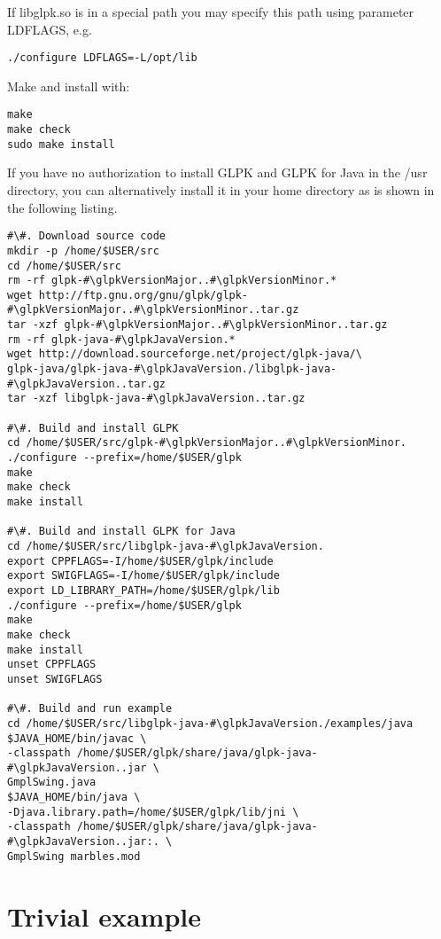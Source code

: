 \documentclass[a4paper,11pt]{report}
\newcommand{\glpkJavaVersion}{1.10.0}
\newcommand{\glpkVersionMajor}{4}
\newcommand{\glpkVersionMinor}{63}
\begin{document}
If libglpk.so is in a special path you may specify this path using parameter
LDFLAGS, e.g.

\begin{lstlisting}
./configure LDFLAGS=-L/opt/lib
\end{lstlisting}

Make and install with:

\begin{lstlisting}
make
make check
sudo make install
\end{lstlisting}

If you have no authorization to install GLPK and GLPK
for Java in the /usr directory, you can alternatively install it in your home
directory as is shown in the following listing.

\begin{lstlisting}
#\#. Download source code
mkdir -p /home/$USER/src
cd /home/$USER/src
rm -rf glpk-#\glpkVersionMajor..#\glpkVersionMinor.*
wget http://ftp.gnu.org/gnu/glpk/glpk-#\glpkVersionMajor..#\glpkVersionMinor..tar.gz
tar -xzf glpk-#\glpkVersionMajor..#\glpkVersionMinor..tar.gz
rm -rf glpk-java-#\glpkJavaVersion.*
wget http://download.sourceforge.net/project/glpk-java/\
glpk-java/glpk-java-#\glpkJavaVersion./libglpk-java-#\glpkJavaVersion..tar.gz
tar -xzf libglpk-java-#\glpkJavaVersion..tar.gz

#\#. Build and install GLPK
cd /home/$USER/src/glpk-#\glpkVersionMajor..#\glpkVersionMinor.
./configure --prefix=/home/$USER/glpk
make
make check
make install

#\#. Build and install GLPK for Java
cd /home/$USER/src/libglpk-java-#\glpkJavaVersion.
export CPPFLAGS=-I/home/$USER/glpk/include
export SWIGFLAGS=-I/home/$USER/glpk/include
export LD_LIBRARY_PATH=/home/$USER/glpk/lib
./configure --prefix=/home/$USER/glpk
make
make check
make install
unset CPPFLAGS
unset SWIGFLAGS

#\#. Build and run example
cd /home/$USER/src/libglpk-java-#\glpkJavaVersion./examples/java
$JAVA_HOME/bin/javac \
-classpath /home/$USER/glpk/share/java/glpk-java-#\glpkJavaVersion..jar \
GmplSwing.java
$JAVA_HOME/bin/java \
-Djava.library.path=/home/$USER/glpk/lib/jni \
-classpath /home/$USER/glpk/share/java/glpk-java-#\glpkJavaVersion..jar:. \
GmplSwing marbles.mod
\end{lstlisting}

\section{Trivial example}
\end{document}
